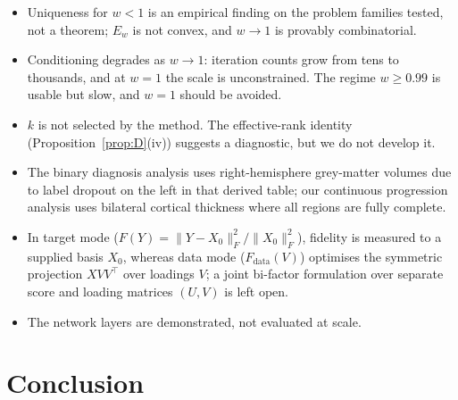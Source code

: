 \documentclass[11pt]{article}
\theoremstyle{definition}
\newcommand{\Fnorm}[1]{\lVert #1 \rVert_F}
\begin{document}
\begin{itemize}
\item Uniqueness for $w<1$ is an empirical finding on the problem families tested,
  not a theorem; $E_w$ is not convex, and $w\to1$ is provably combinatorial.
\item Conditioning degrades as $w \to 1$: iteration counts grow from tens to
  thousands, and at $w=1$ the scale is unconstrained. The regime $w \ge 0.99$ is
  usable but slow, and $w=1$ should be avoided.
\item $k$ is not selected by the method. The effective-rank identity
  (Proposition~\ref{prop:D}(iv)) suggests a diagnostic, but we do not develop it.
\item The binary diagnosis analysis uses right-hemisphere grey-matter volumes due
  to label dropout on the left in that derived table; our continuous progression
  analysis uses bilateral cortical thickness where all regions are fully complete.
\item In target mode ($F(Y) = \Fnorm{Y - X_0}^2/\Fnorm{X_0}^2$), fidelity is
  measured to a supplied basis $X_0$, whereas data mode ($F_{\text{data}}(V)$)
  optimises the symmetric projection $X V V^\top$ over loadings $V$; a joint
  bi-factor formulation over separate score and loading matrices $(U, V)$ is left
  open.
\item The network layers are demonstrated, not evaluated at scale.
\end{itemize}

\section{Conclusion}
\end{document}
